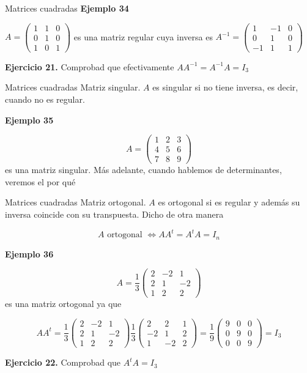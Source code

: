 \documentclass[
  ignorenonframetext,
]{beamer}
\begin{document}
\begin{frame}{Matrices cuadradas}
\protect\hypertarget{matrices-cuadradas-11}{}
\textbf{Ejemplo 34}

\(A = \begin{pmatrix}1&1&0\\0&1&0\\1&0&1\end{pmatrix}\) es una matriz
regular cuya inversa es
\(A^{-1}=\begin{pmatrix}1&-1&0\\0&1&0\\-1&1&1\end{pmatrix}\)

\textbf{Ejercicio 21.} Comprobad que efectivamente
\(AA^{-1}=A^{-1}A=I_3\)
\end{frame}

\begin{frame}{Matrices cuadradas}
\protect\hypertarget{matrices-cuadradas-12}{}
Matriz singular. \(A\) es singular si no tiene inversa, es decir, cuando
no es regular.

\textbf{Ejemplo 35}

\[A = \begin{pmatrix}1&2&3\\4&5&6\\7&8&9\end{pmatrix}\] es una matriz
singular. Más adelante, cuando hablemos de determinantes, veremos el por
qué
\end{frame}

\begin{frame}{Matrices cuadradas}
\protect\hypertarget{matrices-cuadradas-13}{}
Matriz ortogonal. \(A\) es ortogonal si es regular y además su inversa
coincide con su transpuesta. Dicho de otra manera

\[A\text{ ortogonal }\Leftrightarrow AA^t=A^tA = I_n\]

\textbf{Ejemplo 36}

\[A = \frac{1}{3}\begin{pmatrix}2&-2&1\\2&1&-2\\1&2&2\end{pmatrix}\] es
una matriz ortogonal ya que

\[AA^t=\frac{1}{3}\begin{pmatrix}2&-2&1\\2&1&-2\\1&2&2\end{pmatrix}\frac{1}{3}\begin{pmatrix}2&2&1\\-2&1&2\\1&-2&2\end{pmatrix}=\frac{1}{9}\begin{pmatrix}9&0&0\\0&9&0\\0&0&9\end{pmatrix}=I_3\]

\textbf{Ejercicio 22.} Comprobad que \(A^tA=I_3\)
\end{frame}
\end{document}
